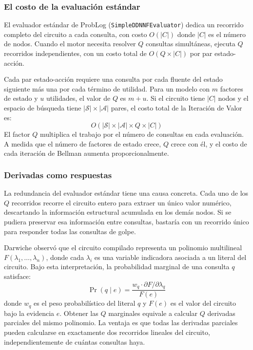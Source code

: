 \subsubsection{El costo de la evaluación estándar}
\label{sec:di-costo-estandar}

El evaluador estándar de ProbLog (\texttt{SimpleDDNNFEvaluator}) dedica un
recorrido completo del circuito a cada consulta, con costo $O(|C|)$ donde
$|C|$ es el número de nodos. Cuando el motor necesita resolver $Q$ consultas
simultáneas, ejecuta $Q$ recorridos independientes, con un costo total de
$O(Q \times |C|)$ por par estado-acción.

Cada par estado-acción requiere una consulta por cada fluente del estado
siguiente más una por cada término de utilidad. Para un modelo con $m$ factores
de estado y $u$ utilidades, el valor de $Q$ es $m + u$. Si el circuito tiene
$|C|$ nodos y el espacio de búsqueda tiene $|\mathcal{S}| \times |\mathcal{A}|$
pares, el costo total de la Iteración de Valor es:
\begin{equation}
    O\!\left(|\mathcal{S}| \times |\mathcal{A}| \times Q \times |C|\right)
    \label{eq:costo-estandar}
\end{equation}
El factor $Q$ multiplica el trabajo por el número de consultas en cada evaluación.
A medida que el número de factores de estado crece, $Q$ crece con él, y el costo
de cada iteración de Bellman aumenta proporcionalmente.

\subsubsection{Derivadas como respuestas}
\label{sec:di-idea-darwiche}

La redundancia del evaluador estándar tiene una causa concreta. Cada uno de los
$Q$ recorridos recorre el circuito entero para extraer un único valor numérico,
descartando la información estructural acumulada en los demás nodos. Si se
pudiera preservar esa información entre consultas, bastaría con un recorrido
único para responder todas las consultas de golpe.

Darwiche observó que el circuito compilado representa un polinomio multilineal
$F(\lambda_1, \ldots, \lambda_n)$, donde cada $\lambda_i$ es una variable
indicadora asociada a un literal del circuito. Bajo esta interpretación, la
probabilidad marginal de una consulta $q$ satisface:
\begin{equation}
    \Pr(q \mid e) = \frac{w_q \cdot \partial F / \partial \lambda_q}{F(e)}
    \label{eq:marginal-derivada}
\end{equation}
donde $w_q$ es el peso probabilístico del literal $q$ y $F(e)$ es el valor del
circuito bajo la evidencia $e$. Obtener las $Q$ marginales equivale a calcular
$Q$ derivadas parciales del mismo polinomio. La ventaja es que todas las
derivadas parciales pueden calcularse en exactamente dos recorridos lineales del
circuito, independientemente de cuántas consultas haya.

